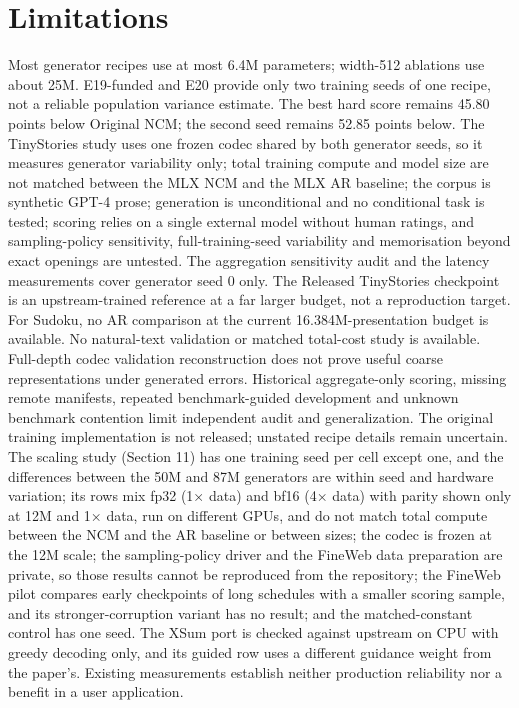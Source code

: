 \documentclass[
  british,
]{article}
\begin{document}
\section{Limitations}\label{limitations}

Most generator recipes use at most 6.4M parameters; width-512 ablations
use about 25M. E19-funded and E20 provide only two training seeds of one
recipe, not a reliable population variance estimate. The best hard score
remains 45.80 points below Original NCM; the second seed remains 52.85
points below. The TinyStories study uses one frozen codec shared by both
generator seeds, so it measures generator variability only; total
training compute and model size are not matched between the MLX NCM and
the MLX AR baseline; the corpus is synthetic GPT-4 prose; generation is
unconditional and no conditional task is tested; scoring relies on a
single external model without human ratings, and sampling-policy
sensitivity, full-training-seed variability and memorisation beyond
exact openings are untested. The aggregation sensitivity audit and the
latency measurements cover generator seed 0 only. The Released
TinyStories checkpoint is an upstream-trained reference at a far larger
budget, not a reproduction target. For Sudoku, no AR comparison at the
current 16.384M-presentation budget is available. No natural-text
validation or matched total-cost study is available. Full-depth codec
validation reconstruction does not prove useful coarse representations
under generated errors. Historical aggregate-only scoring, missing
remote manifests, repeated benchmark-guided development and unknown
benchmark contention limit independent audit and generalization. The
original training implementation is not released; unstated recipe
details remain uncertain. The scaling study (Section 11) has one
training seed per cell except one, and the differences between the 50M
and 87M generators are within seed and hardware variation; its rows mix
fp32 (1× data) and bf16 (4× data) with parity shown only at 12M and 1×
data, run on different GPUs, and do not match total compute between the
NCM and the AR baseline or between sizes; the codec is frozen at the 12M
scale; the sampling-policy driver and the FineWeb data preparation are
private, so those results cannot be reproduced from the repository; the
FineWeb pilot compares early checkpoints of long schedules with a
smaller scoring sample, and its stronger-corruption variant has no
result; and the matched-constant control has one seed. The XSum port is
checked against upstream on CPU with greedy decoding only, and its
guided row uses a different guidance weight from the paper's. Existing
measurements establish neither production reliability nor a benefit in a
user application.
\end{document}
